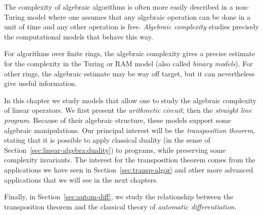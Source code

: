 

The complexity of algebraic algorithms is often more easily described
in a non-Turing model where one assumes that any algebraic operation
can be done in a unit of time and any other operation is
free. \emph{Algebraic complexity} studies precisely the computational
models that behave this way.

  For algorithms over finite rings, the
algebraic complexity gives a precise estimate for the complexity in
the Turing or RAM model (also called \emph{binary models}). For other
rings, the algebraic estimate may be way off target, but it can
nevertheless give useful information.

In this chapter we study models that allow one to study the algebraic
complexity of linear operators. We first present the \emph{arithmetic
  circuit}, then the \emph{straight line program}. Because of their
algebraic structure, these models support some algebraic
manipulations.  Our principal interest will be the \emph{transposition
  theorem}, stating that it is possible to apply classical duality (in
the sense of Section~\ref{sec:linear-algebra:duality}) to programs,
while preserving some complexity invariants. The interest for the
transposition theorem comes from the applications we have seen in
Section~\ref{sec:transp-algor} and other more advanced applications
that we will see in the next chapters.

Finally, in Section~\ref{sec:autom-diff}, we study the
relationship between the transposition theorem and the classical
theory of \emph{automatic differentiation}.



%
